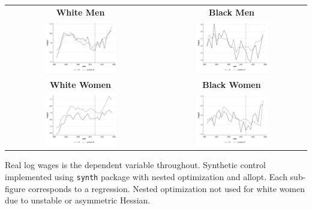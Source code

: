 \documentclass[11pt]{article}
\begin{document}
{\pagebreak
\begin{landscape}
\begin{table}[ht!]
    \centering
    \label{fig:synth_in}
    \begin{tabular}{c c}
          \textbf{White Men} & \textbf{Black Men} \\
          \includegraphics[width = 0.5\textwidth, keepaspectratio]{figures/fin_synth_wm_in.png} & \includegraphics[width = 0.5\textwidth, keepaspectratio]{figures/fin_synth_bm_in.png} \\
          \textbf{White Women} & \textbf{Black Women} \\
          \includegraphics[width = 0.5\textwidth, keepaspectratio]{figures/fin_synth_wf_in.png} & \includegraphics[width = 0.5\textwidth, keepaspectratio]{figures/fin_synth_bf_in.png}
    \end{tabular}
\end{table}
\footnotesize{Real log wages is the dependent variable throughout. Synthetic control implemented using \texttt{synth} package with nested optimization and allopt. Each sub-figure corresponds to a regression. Nested optimization not used for white women due to unstable or asymmetric Hessian.}
\end{landscape}

}
\end{document}
